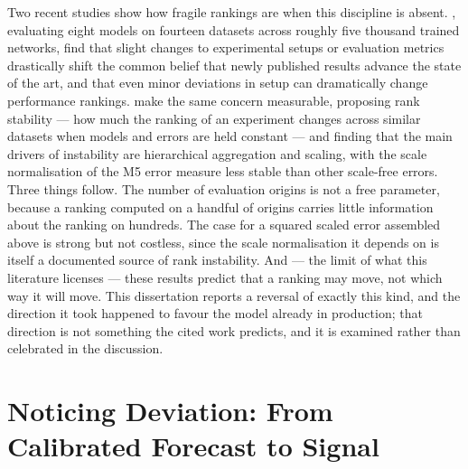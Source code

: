 Two recent studies show how fragile rankings are when this discipline is
absent. \citet{brigato_there_2025}, evaluating eight models on fourteen
datasets across roughly five thousand trained networks, find that slight
changes to experimental setups or evaluation metrics drastically shift the
common belief that newly published results advance the state of the art, and
that even minor deviations in setup can dramatically change performance
rankings. \citet{hewamalage_look_2021} make the same concern measurable,
proposing rank stability --- how much the ranking of an experiment changes
across similar datasets when models and errors are held constant --- and
finding that the main drivers of instability are hierarchical aggregation and
scaling, with the scale normalisation of the M5 error measure less stable than
other scale-free errors. Three things follow. The number of evaluation origins
is not a free parameter, because a ranking computed on a handful of origins
carries little information about the ranking on hundreds. The case for a
squared scaled error assembled above is strong but not costless, since the
scale normalisation it depends on is itself a documented source of rank
instability. And --- the limit of what this literature licenses --- these
results predict that a ranking may move, not which way it will move. This
dissertation reports a reversal of exactly this kind, and the direction it took
happened to favour the model already in production; that direction is not
something the cited work predicts, and it is examined rather than celebrated in
the discussion.

\section{Noticing Deviation: From Calibrated Forecast to Signal}
\label{sec:rw-deviation}

